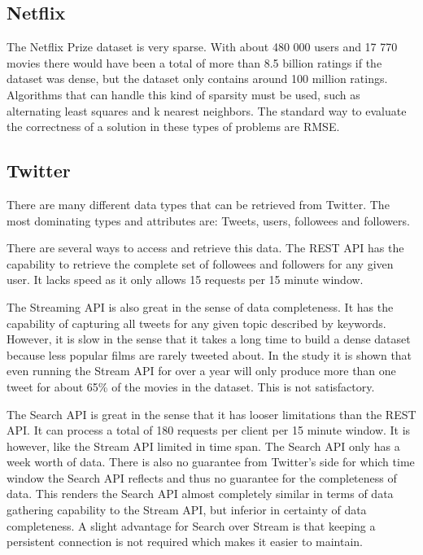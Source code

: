 \subsection{Netflix}
The Netflix Prize dataset is very sparse. With about 480 000 users and 17 770 movies there would have been a total of more than 8.5 billion ratings if the dataset was dense, but the dataset only contains around 100 million ratings. Algorithms that can handle this kind of sparsity must be used, such as alternating least squares and k nearest neighbors. The standard way to evaluate the correctness of a solution in these types of problems are RMSE.

\subsection{Twitter}\label{sec:prestrud-eval-twitter}
There are many different data types that can be retrieved from Twitter. The most dominating types and attributes are: Tweets, users, followees and followers.

There are several ways to access and retrieve this data. The REST API has the capability to retrieve the complete set of followees and followers for any given user. It lacks speed as it only allows 15 requests per 15 minute window.

The Streaming API is also great in the sense of data completeness. It has the capability of capturing all tweets for any given topic described by keywords. However, it is slow in the sense that it takes a long time to build a dense dataset because less popular films are rarely tweeted about. In the study it is shown that even running the Stream API for over a year will only produce more than one tweet for about 65\% of the movies in the dataset. This is not satisfactory.

The Search API is great in the sense that it has looser limitations than the REST API. It can process a total of 180 requests per client per 15 minute window. It is however, like the Stream API limited in time span. The Search API only has a week worth of data. There is also no guarantee from Twitter's side for which time window the Search API reflects and thus no guarantee for the completeness of data. This renders the Search API almost completely similar in terms of data gathering capability to the Stream API, but inferior in certainty of data completeness. A slight advantage for Search over Stream is that keeping a persistent connection is not required which makes it easier to maintain.

